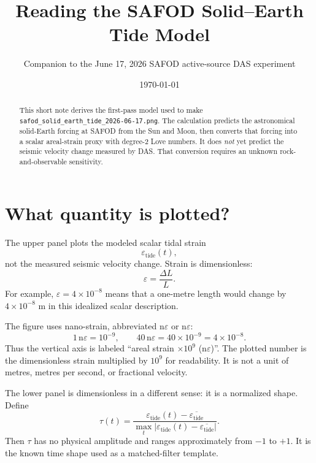 \documentclass[11pt]{article}
\title{\textbf{Reading the SAFOD Solid--Earth Tide Model}}
\author{Companion to the June 17, 2026 SAFOD active-source DAS experiment}
\date{\today}
\newcommand{\eps}{\varepsilon}
\begin{document}
\maketitle

\begin{abstract}
This short note derives the first-pass model used to make
\texttt{safod\_solid\_earth\_tide\_2026-06-17.png}.  The calculation predicts
the astronomical solid-Earth forcing at SAFOD from the Sun and Moon, then
converts that forcing into a scalar areal-strain proxy with degree-2 Love
numbers.  It does \emph{not} yet predict the seismic velocity change measured
by DAS.  That conversion requires an unknown rock-and-observable sensitivity.
\end{abstract}

\section{What quantity is plotted?}

The upper panel plots the modeled scalar tidal strain
\begin{equation}
  \eps_{\mathrm{tide}}(t),
\end{equation}
not the measured seismic velocity change.  Strain is dimensionless:
\begin{equation}
  \eps = \frac{\Delta L}{L}.
\end{equation}
For example, $\eps=4\times10^{-8}$ means that a one-metre length would change
by $4\times10^{-8}$ m in this idealized scalar description.

The figure uses nano-strain, abbreviated n$\eps$ or n$\varepsilon$:
\begin{equation}
  1\,\mathrm{n}\eps = 10^{-9},
  \qquad
  40\,\mathrm{n}\eps = 40\times10^{-9}=4\times10^{-8}.
\end{equation}
Thus the vertical axis is labeled
``areal strain $\times 10^9$ (n$\eps$)''.  The plotted number is the
dimensionless strain multiplied by $10^9$ for readability.  It is not a unit
of metres, metres per second, or fractional velocity.

The lower panel is dimensionless in a different sense: it is a normalized
shape.  Define
\begin{equation}
  \tau(t) =
  \frac{\eps_{\mathrm{tide}}(t)-\overline{\eps_{\mathrm{tide}}}}
       {\max_t\left|\eps_{\mathrm{tide}}(t)-\overline{\eps_{\mathrm{tide}}}\right|}.
\end{equation}
Then $\tau$ has no physical amplitude and ranges approximately from $-1$ to
$+1$.  It is the known time shape used as a matched-filter template.
\end{document}
